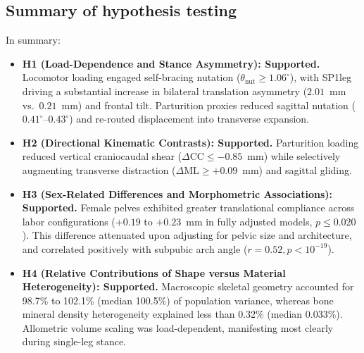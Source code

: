 \subsection{Summary of hypothesis testing}
In summary:
\begin{itemize}
\item \textbf{H1 (Load-Dependence and Stance Asymmetry): Supported.} Locomotor loading engaged self-bracing nutation ($\theta_{\text{nut}} \ge 1.06^\circ$), with SP1leg driving a substantial increase in bilateral translation asymmetry ($2.01$~mm vs.\ $0.21$~mm) and frontal tilt. Parturition proxies reduced sagittal nutation ($0.41^\circ$--$0.43^\circ$) and re-routed displacement into transverse expansion.
\item \textbf{H2 (Directional Kinematic Contrasts): Supported.} Parturition loading reduced vertical craniocaudal shear ($\Delta\text{CC} \le -0.85$~mm) while selectively augmenting transverse distraction ($\Delta\text{ML} \ge +0.09$~mm) and sagittal gliding.
\item \textbf{H3 (Sex-Related Differences and Morphometric Associations): Supported.} Female pelves exhibited greater translational compliance across labor configurations ($+0.19$ to $+0.23$~mm in fully adjusted models, $p \le 0.020$). This difference attenuated upon adjusting for pelvic size and architecture, and correlated positively with subpubic arch angle ($r = 0.52, p < 10^{-19}$).
\item \textbf{H4 (Relative Contributions of Shape versus Material Heterogeneity): Supported.} Macroscopic skeletal geometry accounted for 98.7\% to 102.1\% (median 100.5\%) of population variance, whereas bone mineral density heterogeneity explained less than 0.32\% (median 0.033\%). Allometric volume scaling was load-dependent, manifesting most clearly during single-leg stance.
\end{itemize}
